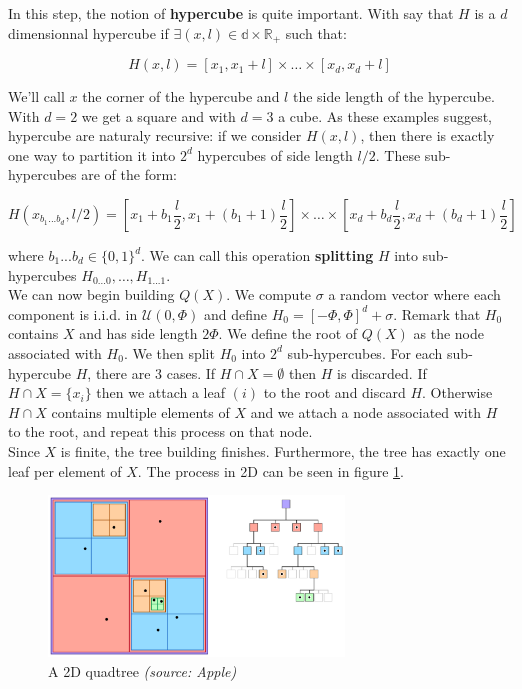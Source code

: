 \documentclass[11pt]{article}
\begin{document}
In this step, the notion of \textbf{hypercube} is quite important. With say that $H$ is a $d$ dimensionnal hypercube if $\exists (x, l) \in \mathbb{d} \times \mathbb{R}_+$ such that:

$$
H(x, l) = [x_1, x_1 + l] \times \dots \times [x_d, x_d + l]
$$

We'll call $x$ the corner of the hypercube and $l$ the side length of the hypercube. With $d=2$ we get a square and with $d=3$ a cube. As these examples suggest, hypercube are naturaly recursive: if we consider $H(x, l)$, then there is exactly one way to partition it into $2^d$ hypercubes of side length $l/2$. These sub-hypercubes are of the form:

$$
H(x_{b_1...b_d}, l/2) = [x_1 + b_1 \frac{l}{2}, x_1 + (b_1+1) \frac{l}{2}] \times \dots \times [x_d + b_d \frac{l}{2}, x_d + (b_d+1) \frac{l}{2}]
$$

where $b_1...b_d \in \{ 0, 1 \}^d$. We can call this operation \textbf{splitting} $H$ into sub-hypercubes $H_{0...0}, \dots, H_{1...1}$.\\

We can now begin building $Q(X)$. We compute $\sigma$ a random vector where each component is i.i.d. in $\mathcal{U}(0, \Phi)$ and define $H_0 = [-\Phi, \Phi]^d + \sigma$. Remark that $H_0$ contains $X$ and has side length $2\Phi$. We define the root of $Q(X)$ as the node associated with $H_0$. We then split $H_0$ into $2^d$ sub-hypercubes. For each sub-hypercube $H$, there are 3 cases. If $H \cap X = \emptyset$ then $H$ is discarded. If $H \cap X = \{x_i\}$ then we attach a leaf $(i)$ to the root and discard $H$. Otherwise $H \cap X$ contains multiple elements of $X$ and we attach a node associated with $H$ to the root, and repeat this process on that node.\\
Since $X$ is finite, the tree building finishes. Furthermore, the tree has exactly one leaf per element of $X$. The process in 2D can be seen in figure \ref{quadtree}.

\begin{figure}[h]
\centering
\includegraphics[width=0.7\textwidth]{imgs/quadtree.png}
\caption{A 2D quadtree \textit{(source: Apple)}}
\label{quadtree}
\end{figure}
\end{document}
